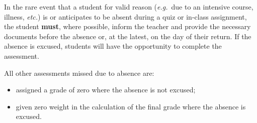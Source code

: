 \entry{\mbox{ }}
{In the rare event that a student for valid reason (\textit{e.g.}~due to an intensive course, illness, \textit{etc.}) is or anticipates to be absent during a quiz or in-class assignment, the student \textbf{must}, where possible, inform the teacher and provide the necessary documents before the absence or, at the latest, on the day of their return.  If the absence is excused, students will have the opportunity to complete the assessment.
\smallskip

All other assessments missed due to absence are:
\begin{itemize}
	\item assigned a grade of zero where the absence is not excused;
	\item given zero weight in the calculation of the final grade where the absence is excused.
\end{itemize}
}

